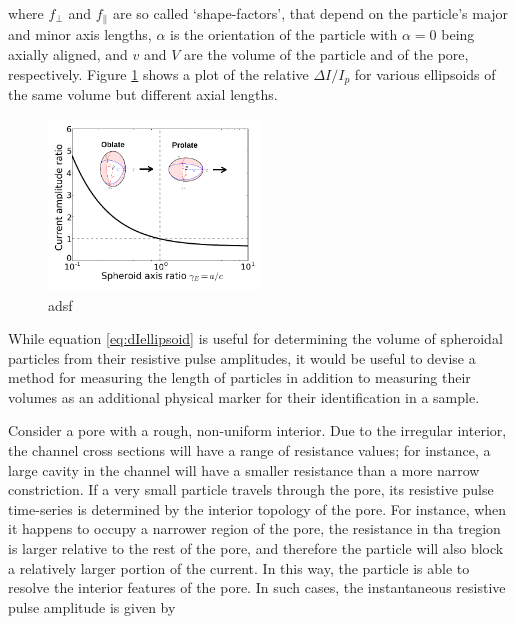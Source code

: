 		where $f_{\perp}$ and $f_{\parallel}$ are so called `shape-factors', that depend on the particle's major and minor axis lengths, $\alpha$ is the orientation of the particle with $\alpha=0$ being axially aligned, and $v$ and $V$ are the volume of the particle and of the pore, respectively. Figure \ref{fig:dIellipsoid} shows a plot of the relative $\Delta I/I_{p}$ for various ellipsoids of the same volume but different axial lengths.
		
		\begin{figure}
			\includegraphics[width=0.5\textwidth]{dIellipsoid}
			\caption{adsf}
			\label{fig:dIellipsoid}
		\end{figure}

		
		
		
		
		
		
		While equation \ref{eq:dIellipsoid} is useful for determining the volume of spheroidal particles from their resistive pulse amplitudes, it would be useful to devise a method for measuring the length of particles in addition to measuring their volumes as an additional physical marker for their identification in a sample.
		
		Consider a pore with a rough, non-uniform interior. Due to the irregular interior, the channel cross sections will have a range of resistance values; for instance, a large cavity in the channel will have a smaller resistance than a more narrow constriction. If a very small particle travels through the pore, its resistive pulse time-series is determined by the interior topology of the pore. For instance, when it happens to occupy a narrower region of the pore, the resistance in tha tregion is larger relative to the rest of the pore, and therefore the particle  will also block a relatively larger portion of the current. In this way, the particle is able to resolve the interior features of the pore. In such cases, the instantaneous resistive pulse amplitude is given by 
		
